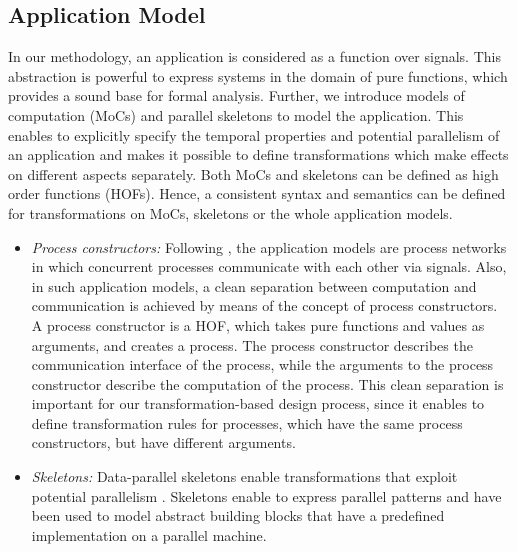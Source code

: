 \subsection{Application Model}
\label{sec:application model}
In our methodology, an application is considered as a function over signals.
This abstraction is powerful to express systems in the domain of pure functions, which provides a sound base for formal analysis. Further, we introduce models of computation (MoCs) \cite{LeeSan1998} and parallel skeletons \cite{Cole1989a,Ski1994} to model the application. This enables to explicitly specify the temporal properties and potential parallelism of an application and makes it possible to define transformations which make effects on different aspects separately. Both MoCs and skeletons can be defined as high order functions (HOFs). Hence, a consistent syntax and semantics can be defined for transformations on MoCs, skeletons or the whole application models.
\begin{itemize}[leftmargin=*]
	\setlength{\parskip}{1pt} 
	\setlength{\itemsep}{0pt plus 0pt}
    \item \textit{Process constructors:} Following \cite{sander2004system}, the application models are process networks in which concurrent processes communicate with each other via signals. Also, in such application models, a clean separation between computation and communication is achieved by means of the concept of process constructors. A process constructor is a HOF, which takes pure functions and values as arguments, and creates a process. The process constructor describes the communication interface of the process, while the arguments to the process constructor describe the computation of the process. This clean separation is important for our transformation-based design process, since it enables to define transformation rules for processes, which have the same process constructors, but have different arguments.
    \item \textit{Skeletons:} Data-parallel skeletons enable transformations that exploit potential parallelism \cite{Cole1989a,Ski1994}. Skeletons enable to express parallel patterns and have been used to model abstract building blocks that have a predefined implementation on a parallel machine. 
\end{itemize}

